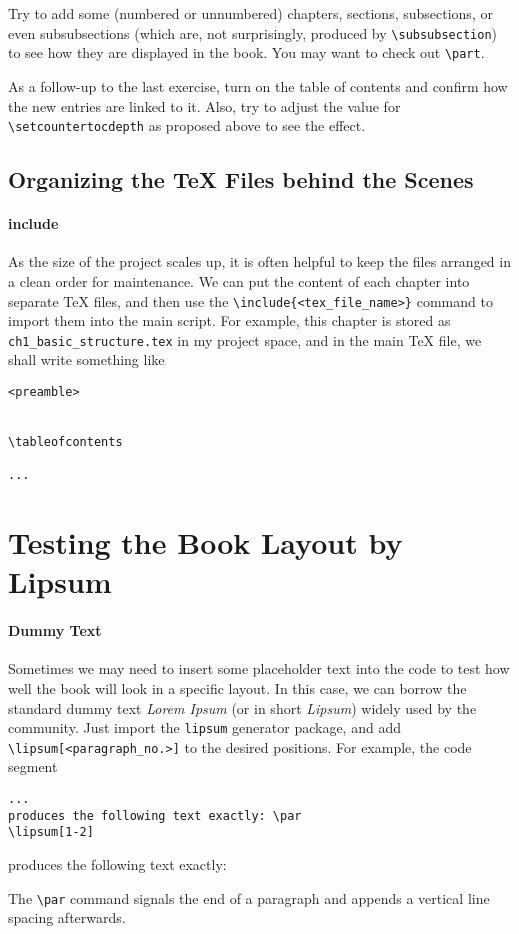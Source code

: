 \begin{exercisebox}
\begin{Exercise}
Try to add some (numbered or unnumbered) chapters, sections, subsections, or even subsubsections (which are, not surprisingly, produced by \texttt{\textbackslash subsubsection}) to see how they are displayed in the book. You may want to check out \texttt{\textbackslash part}.
\end{Exercise}
\begin{Exercise}
As a follow-up to the last exercise, turn on the table of contents and confirm how the new entries are linked to it. Also, try to adjust the value for \texttt{\textbackslash setcounter{tocdepth}} as proposed above to see the effect.
\end{Exercise}
\end{exercisebox}

\subsection{Organizing the \TeX{} Files behind the Scenes}
\label{subsection:TeXorg}
\paragraph{include} As the size of the project scales up, it is often helpful to keep the files arranged in a clean order for maintenance. We can put the content of each chapter into separate \TeX{} files, and then use the \texttt{\textbackslash include\{<tex\_file\_name>\}} command to import them into the main script. For example, this chapter is stored as \texttt{ch1\_basic\_structure.tex} in my project space, and in the main \TeX{} file, we shall write something like
\begin{lstlisting}
<preamble>


\tableofcontents

...

\end{lstlisting}

\section{Testing the Book Layout by Lipsum}

\paragraph{Dummy Text} Sometimes we may need to insert some placeholder text into the code to test how well the book will look in a specific layout. In this case, we can borrow the standard dummy text \textit{Lorem Ipsum} (or in short \textit{Lipsum}) widely used by the community. Just import the \verb|lipsum| generator package, and add \texttt{\textbackslash lipsum[<paragraph\_no.>]} to the desired positions. For example, the code segment
\begin{lstlisting}
...
produces the following text exactly: \par
\lipsum[1-2]
\end{lstlisting}
produces the following text exactly: \par
\lipsum[1-2] \par
The \texttt{\textbackslash par} command signals the end of a paragraph and appends a vertical line spacing afterwards. 